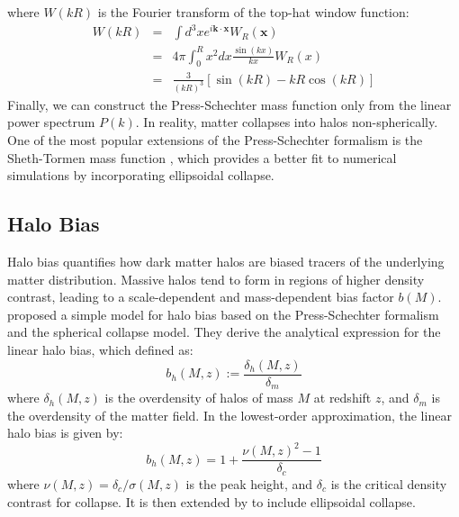 where $W(kR)$ is the Fourier transform of the top-hat window function:
\begin{eqnarray}
    W(kR) &=& \int d^3 x e^{i\boldsymbol{k} \cdot \boldsymbol{x}} W_R(\boldsymbol{x}) \nonumber \\
    &=& 4\pi \int_0^R x^2 dx \frac{\sin(kx)}{kx} W_R(x) \nonumber \\
    &=& \frac{3}{(kR)^3} \left[ \sin(kR) - kR \cos(kR) \right]
\end{eqnarray}
Finally, we can construct the Press-Schechter mass function only from the linear power spectrum $P(k)$.
In reality, matter collapses into halos non-spherically. One of the most popular extensions of the Press-Schechter formalism is the Sheth-Tormen mass function \citep{1999MNRAS.308..119S}, which provides a better fit to numerical simulations by incorporating ellipsoidal collapse.

\subsection{Halo Bias}
Halo bias quantifies how dark matter halos are biased tracers of the underlying matter distribution. Massive halos tend to form in regions of higher density contrast, leading to a scale-dependent and mass-dependent bias factor $b(M)$.
\citet{1996MNRAS.282..347M} proposed a simple model for halo bias based on the Press-Schechter formalism and the spherical collapse model. They derive the analytical expression for the linear halo bias, which defined as:
\begin{equation}
    b_h(M, z) := \frac{\delta_h(M, z)}{\delta_m}
\end{equation}
where $\delta_h(M, z)$ is the overdensity of halos of mass $M$ at redshift $z$, and $\delta_m$ is the overdensity of the matter field. In the lowest-order approximation, the linear halo bias is given by:
\begin{equation}
    b_h(M, z) = 1 + \frac{\nu(M, z)^2 - 1}{\delta_c}
\end{equation}
where $\nu(M, z) = \delta_c / \sigma(M, z)$ is the peak height, and $\delta_c$ is the critical density contrast for collapse. It is then extended by \citet{2001MNRAS.323....1S} to include ellipsoidal collapse.

